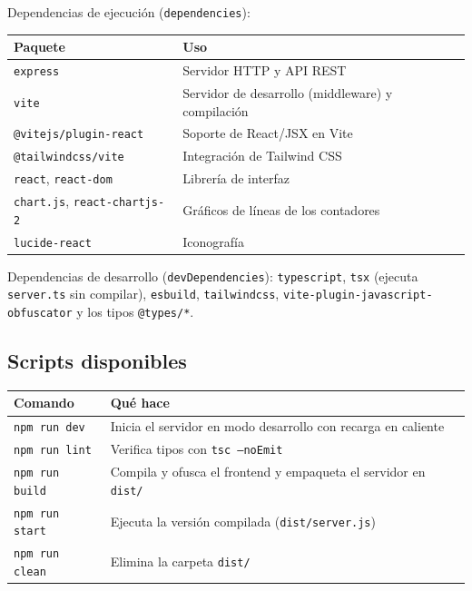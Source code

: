 \documentclass[11pt,a4paper]{article}
\newcommand{\ruta}[1]{\texttt{#1}}
\begin{document}
Dependencias de ejecución (\texttt{dependencies}):
\begin{center}
\begin{tabularx}{\linewidth}{lX}
\toprule
\textbf{Paquete} & \textbf{Uso} \\
\midrule
\texttt{express}               & Servidor HTTP y API REST \\
\texttt{vite}                  & Servidor de desarrollo (middleware) y compilación \\
\texttt{@vitejs/plugin-react}  & Soporte de React/JSX en Vite \\
\texttt{@tailwindcss/vite}     & Integración de Tailwind CSS \\
\texttt{react}, \texttt{react-dom} & Librería de interfaz \\
\texttt{chart.js}, \texttt{react-chartjs-2} & Gráficos de líneas de los contadores \\
\texttt{lucide-react}          & Iconografía \\
\bottomrule
\end{tabularx}
\end{center}

Dependencias de desarrollo (\texttt{devDependencies}): \texttt{typescript}, \texttt{tsx}
(ejecuta \ruta{server.ts} sin compilar), \texttt{esbuild}, \texttt{tailwindcss},
\texttt{vite-plugin-javascript-obfuscator} y los tipos \texttt{@types/*}.

\subsection{Scripts disponibles}
\begin{center}
\begin{tabularx}{\linewidth}{lX}
\toprule
\textbf{Comando} & \textbf{Qué hace} \\
\midrule
\texttt{npm run dev}   & Inicia el servidor en modo desarrollo con recarga en caliente \\
\texttt{npm run lint}  & Verifica tipos con \texttt{tsc --noEmit} \\
\texttt{npm run build} & Compila y ofusca el frontend y empaqueta el servidor en \ruta{dist/} \\
\texttt{npm run start} & Ejecuta la versión compilada (\ruta{dist/server.js}) \\
\texttt{npm run clean} & Elimina la carpeta \ruta{dist/} \\
\bottomrule
\end{tabularx}
\end{center}
\end{document}
